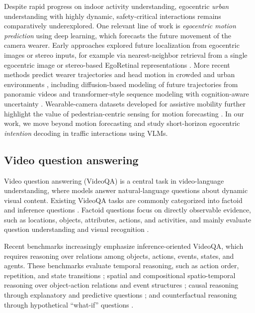\documentclass[letterpaper, 10pt, journal]{IEEEtran}  %
\begin{document}
Despite rapid progress on indoor activity understanding, egocentric \emph{urban} understanding with highly dynamic, safety-critical interactions remains comparatively underexplored.
One relevant line of work is \emph{egocentric motion prediction} using deep learning, which forecasts the future movement of the camera wearer. Early approaches explored future localization from egocentric images or stereo inputs, for example via nearest-neighbor retrieval from a single egocentric image \cite{singh_krishnacam_2016} or stereo-based EgoRetinal representations \cite{park2016egocentric}. More recent methods predict wearer trajectories and head motion in crowded and urban environments \cite{qiu_egocentric_2022, pan2025lookout}, including diffusion-based modeling of future trajectories from panoramic videos \cite{wang_egonav_2024} and transformer-style sequence modeling with cognition-aware uncertainty \cite{qiu_egocognav_2025}. Wearable-camera datasets developed for assistive mobility further highlight the value of pedestrian-centric sensing for motion forecasting \cite{haghighi2024heads}. In our work, we move beyond motion forecasting and study short-horizon egocentric \emph{intention} decoding in traffic interactions using VLMs.

\subsection{Video question answering}


Video question answering (VideoQA) is a central task in video-language understanding, where models answer natural-language questions about dynamic visual content. Existing VideoQA tasks are commonly categorized into factoid and inference questions \cite{zhong2022video}. Factoid questions focus on directly observable evidence, such as locations, objects, attributes, actions, and activities, and mainly evaluate question understanding and visual recognition \cite{zhong2022video,xu2017video,jang2017tgif,yu2019activitynet}.

Recent benchmarks increasingly emphasize inference-oriented VideoQA, which requires reasoning over relations among objects, actions, events, states, and agents. These benchmarks evaluate temporal reasoning, such as action order, repetition, and state transitions \cite{jang2017tgif,xiao2021next}; spatial and compositional spatio-temporal reasoning over object-action relations and event structures \cite{jang2017tgif,grunde2021agqa}; causal reasoning through explanatory and predictive questions \cite{xiao2021next,li2022from}; and counterfactual reasoning through hypothetical ``what-if'' questions \cite{li2022from,jia2022egotaskqa}.
\end{document}
